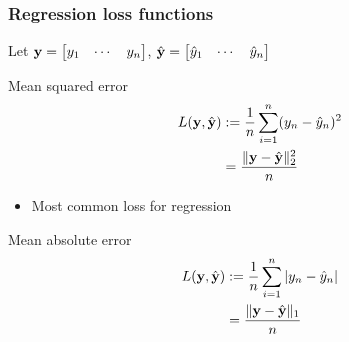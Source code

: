 \begin{frame}
    \frametitle{Regression loss functions}
    Let $\mathbf{y} = \begin{bmatrix} y_1 & \cdots & y_n \end{bmatrix}$,
    $\hat{\mathbf{y}} = \begin{bmatrix} \hat{y}_1 & \cdots & \hat{y}_n \end{bmatrix}$

    \begin{block}{Mean squared error}
        \vspace{-1em}
        \begin{align*}
            L(\mathbf{y}, \hat{\mathbf{y}}) &:= \frac{1}{n} \sum_{i=1}^n (y_n - \hat{y}_n)^2 \\
            &= \dfrac{\|\mathbf{y} - \hat{\mathbf{y}}\|_2^2}{n}
        \end{align*}
        \vspace{-1em}
        \begin{itemize}
            \item Most common loss for regression
        \end{itemize}
    \end{block}

    \begin{block}{Mean absolute error}
        \vspace{-1em}
        \begin{align*}
            L(\mathbf{y}, \hat{\mathbf{y}}) &:= \frac{1}{n} \sum_{i=1}^n |y_n - \hat{y}_n| \\
            &= \dfrac{\|\mathbf{y} - \hat{\mathbf{y}}\|_1}{n}
        \end{align*}
        \vspace{-1em}
    \end{block}
\end{frame}


